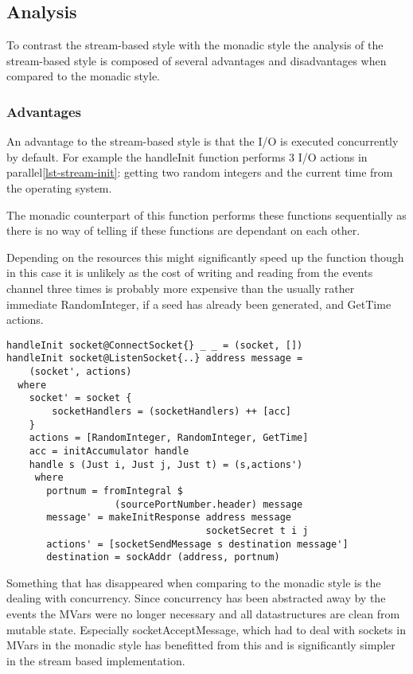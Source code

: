 \subsection{Analysis}
To contrast the stream-based style with the monadic style the analysis of the stream-based style is composed of several advantages and disadvantages when compared to the monadic style.

\subsubsection{Advantages}
An advantage to the stream-based style is that the I/O is executed concurrently by default. For example the handleInit function performs 3 I/O actions in parallel\ref{lst-stream-init}: getting two random integers and the current time from the operating system. 

The monadic counterpart of this function performs these functions sequentially as there is no way of telling if these functions are dependant on each other.

Depending on the resources this might significantly speed up the function though in this case it is unlikely as the cost of writing and reading from the events channel three times is probably more expensive than the usually rather immediate RandomInteger, if a seed has already been generated, and GetTime actions. 

\begin{lstlisting}[caption={The init handler}, label={lst-stream-init}]
handleInit socket@ConnectSocket{} _ _ = (socket, [])
handleInit socket@ListenSocket{..} address message =
    (socket', actions)
  where
    socket' = socket { 
        socketHandlers = (socketHandlers) ++ [acc]
    }
    actions = [RandomInteger, RandomInteger, GetTime]
    acc = initAccumulator handle
    handle s (Just i, Just j, Just t) = (s,actions')
     where
       portnum = fromIntegral $
                   (sourcePortNumber.header) message
       message' = makeInitResponse address message
                                   socketSecret t i j
       actions' = [socketSendMessage s destination message']
       destination = sockAddr (address, portnum)
\end{lstlisting}

Something that has disappeared when comparing to the monadic style is the dealing with concurrency. Since concurrency has been abstracted away by the events the MVars were no longer necessary and all datastructures are clean from mutable state.
Especially socketAcceptMessage, which had to deal with sockets in MVars in the monadic style has benefitted from this and is significantly simpler in the stream based implementation.

